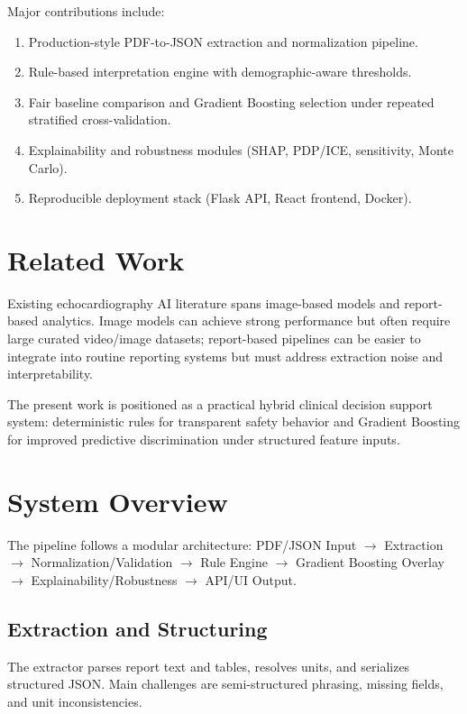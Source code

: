 \documentclass[10pt,twocolumn,letterpaper]{IEEEtran}
\begin{document}
Major contributions include:
\begin{enumerate}
\item Production-style PDF-to-JSON extraction and normalization pipeline.
\item Rule-based interpretation engine with demographic-aware thresholds.
\item Fair baseline comparison and Gradient Boosting selection under repeated stratified cross-validation.
\item Explainability and robustness modules (SHAP, PDP/ICE, sensitivity, Monte Carlo).
\item Reproducible deployment stack (Flask API, React frontend, Docker).
\end{enumerate}

\section{Related Work}
Existing echocardiography AI literature spans image-based models and report-based analytics. Image models can achieve strong performance but often require large curated video/image datasets; report-based pipelines can be easier to integrate into routine reporting systems but must address extraction noise and interpretability.

The present work is positioned as a practical hybrid clinical decision support system: deterministic rules for transparent safety behavior and Gradient Boosting for improved predictive discrimination under structured feature inputs.

\section{System Overview}
The pipeline follows a modular architecture: PDF/JSON Input $\rightarrow$ Extraction $\rightarrow$ Normalization/Validation $\rightarrow$ Rule Engine $\rightarrow$ Gradient Boosting Overlay $\rightarrow$ Explainability/Robustness $\rightarrow$ API/UI Output.

\subsection{Extraction and Structuring}
The extractor parses report text and tables, resolves units, and serializes structured JSON. Main challenges are semi-structured phrasing, missing fields, and unit inconsistencies.
\end{document}

